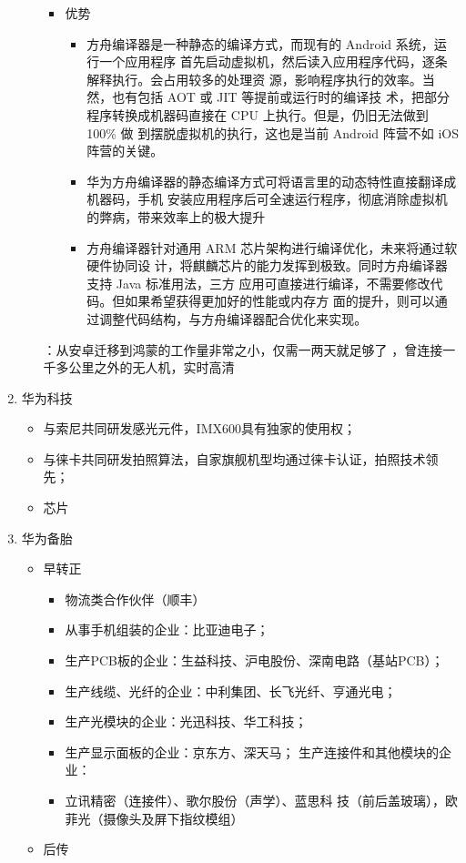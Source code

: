 \documentclass{article}
\begin{document}
\begin{enumerate}
\begin{itemize}
\begin{itemize}
    \item 优势 
     \begin{itemize}
    \item 方舟编译器是一种静态的编译方式，而现有的 Android 系统，运行一个应用程序 首先启动虚拟机，然后读入应用程序代码，逐条解释执行。会占用较多的处理资 源，影响程序执行的效率。当然，也有包括 AOT 或 JIT 等提前或运行时的编译技 术，把部分程序转换成机器码直接在 CPU 上执行。但是，仍旧无法做到 100\% 做 到摆脱虚拟机的执行，这也是当前 Android 阵营不如 iOS 阵营的关键。 
    \item 华为方舟编译器的静态编译方式可将语言里的动态特性直接翻译成机器码，手机 安装应用程序后可全速运行程序，彻底消除虚拟机的弊病，带来效率上的极大提升
    \item 方舟编译器针对通用 ARM 芯片架构进行编译优化，未来将通过软硬件协同设 计，将麒麟芯片的能力发挥到极致。同时方舟编译器支持 Java 标准用法，三方 应用可直接进行编译，不需要修改代码。但如果希望获得更加好的性能或内存方 面的提升，则可以通过调整代码结构，与方舟编译器配合优化来实现。
\end{itemize}
\end{itemize}

	：从安卓迁移到鸿蒙的工作量非常之小，仅需一两天就足够了 
	，曾连接一千多公里之外的无人机，实时高清 
\end{itemize}

	\item 华为科技 
\begin{itemize}
    \item 与索尼共同研发感光元件，IMX600具有独家的使用权；
    \item 与徕卡共同研发拍照算法，自家旗舰机型均通过徕卡认证，拍照技术领先；
    \item 芯片
\end{itemize}
 
 
	\item 华为备胎
\begin{itemize}
    \item 早转正
\begin{itemize}
    \item 物流类合作伙伴（顺丰）
    \item 从事手机组装的企业：比亚迪电子；
    \item  生产PCB板的企业：生益科技、沪电股份、深南电路（基站PCB）； 
	\item 生产线缆、光纤的企业：中利集团、长飞光纤、亨通光电；
	\item 生产光模块的企业：光迅科技、华工科技；
	\item 生产显示面板的企业：京东方、深天马； 生产连接件和其他模块的企业：
	\item  立讯精密（连接件）、歌尔股份（声学）、蓝思科 技（前后盖玻璃），欧菲光（摄像头及屏下指纹模组）  
\end{itemize}
    \item 后传


\end{itemize}
\end{enumerate}
\end{document}
